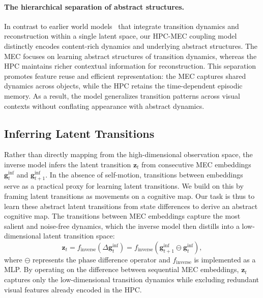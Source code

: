 \paragraph{The hierarchical separation of abstract structures.}
In contrast to earlier world models~\citep{lapo,yeLatentActionPretraining2024,chenMotoLatentMotion2024} that integrate transition dynamics and reconstruction within a single latent space, our HPC-MEC coupling model distinctly encodes content-rich dynamics and underlying abstract structures.
The MEC focuses on learning abstract structures of transition dynamics, whereas the HPC maintains richer contextual information for reconstruction. 
This separation promotes feature reuse and efficient representation: the MEC captures shared dynamics across objects, while the HPC retains the time-dependent episodic memory. As a result, the model generalizes transition patterns across visual contexts without conflating appearance with abstract dynamics.

\subsection{Inferring Latent Transitions}
\label{methods:inverse_model}
Rather than directly mapping from the high-dimensional observation space, the inverse model infers the latent transition $\boldsymbol{z}_t$ from consecutive MEC embeddings $\boldsymbol{g}_{t}^{\text{inf}}$ and $\boldsymbol{g}_{t+1}^{\text{inf}}$. 
In the absence of self-motion, transitions between embeddings serve as a practical proxy for learning latent transitions. We build on this by framing latent transitions as movements on a cognitive map. Our task is thus to learn these abstract latent transitions from state differences to derive an abstract cognitive map. The transitions between MEC embeddings capture the most salient and noise-free dynamics, which the inverse model then distills into a low-dimensional latent transition space:
\begin{equation}
    \boldsymbol{z}_t = f_{\text{inverse}}(\Delta \boldsymbol{g}_{t}^{\text{inf}})= f_{\text{inverse}}(\boldsymbol{g}_{t+1}^{\text{inf}} \ominus \boldsymbol{g}_{t}^{\text{inf}}),
\end{equation}
where $\ominus$ represents the phase difference operator and $f_{\text{inverse}}$ is implemented as a MLP. By operating on the difference between sequential MEC embeddings, $\boldsymbol{z}_t$ captures only the low-dimensional transition dynamics while excluding redundant visual features already encoded in the HPC. 

